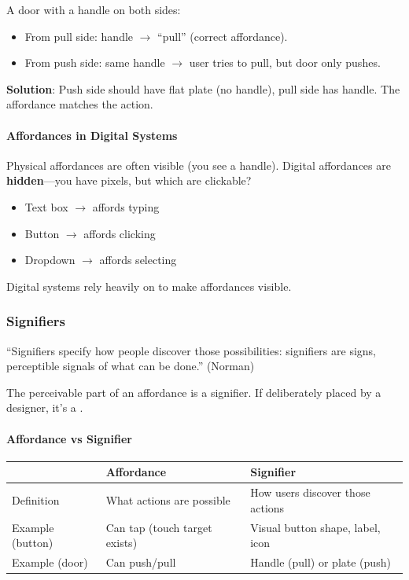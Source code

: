 \begin{exbox}
A door with a handle on both sides:
\begin{itemize}
  \item From pull side: handle $\to$ ``pull'' (correct affordance).
  \item From push side: same handle $\to$ user tries to pull, but door only pushes.
\end{itemize}
\textbf{Solution}: Push side should have flat plate (no handle), pull side has handle. The affordance matches the action.
\end{exbox}

\paragraph*{Affordances in Digital Systems}
Physical affordances are often visible (you see a handle). Digital affordances are \textbf{hidden}---you have pixels, but which are clickable?
\begin{itemize}
  \item Text box $\to$ affords typing
  \item Button $\to$ affords clicking
  \item Dropdown $\to$ affords selecting
\end{itemize}
Digital systems rely heavily on  to make affordances visible.

\subsubsection*{Signifiers}

\begin{defbox}[Signifier]
``Signifiers specify how people discover those possibilities: signifiers are signs, perceptible signals of what can be done.'' (Norman)

The perceivable part of an affordance is a signifier. If deliberately placed by a designer, it's a .
\end{defbox}

\paragraph*{Affordance vs Signifier}
\begin{center}
\renewcommand{\arraystretch}{1.3}
\begin{tabular}{@{} l p{5cm} p{5cm} @{}}
\toprule
& \textbf{Affordance} & \textbf{Signifier} \\
\midrule
Definition & What actions are possible & How users discover those actions \\
Example (button) & Can tap (touch target exists) & Visual button shape, label, icon \\
Example (door) & Can push/pull & Handle (pull) or plate (push) \\
\bottomrule
\end{tabular}
\end{center}

